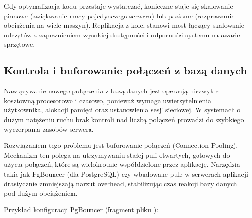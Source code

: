 \documentclass[a4paper,11pt,english,openany,oneside]{sphinxmanual}
\begin{document}
\sphinxAtStartPar
Gdy optymalizacja kodu przestaje wystarczać, konieczne staje się skalowanie \textendash{} pionowe (zwiększanie mocy pojedynczego serwera) lub poziome (rozpraszanie obciążenia na wiele maszyn). Replikacja z kolei stanowi most łączący skalowanie odczytów z zapewnieniem wysokiej dostępności i odporności systemu na awarie sprzętowe.


\subsection{Kontrola i buforowanie połączeń z bazą danych}
\label{\detokenize{rozdzial_2/rozdzial_25/index:kontrola-i-buforowanie-polaczen-z-baza-danych}}
\sphinxAtStartPar
Nawiązywanie nowego połączenia z bazą danych jest operacją niezwykle kosztowną procesorowo i czasowo, ponieważ wymaga uwierzytelnienia użytkownika, alokacji pamięci oraz ustanowienia sesji sieciowej. W systemach o dużym natężeniu ruchu brak kontroli nad liczbą połączeń prowadzi do szybkiego wyczerpania zasobów serwera.

\sphinxAtStartPar
Rozwiązaniem tego problemu jest buforowanie połączeń (Connection Pooling). Mechanizm ten polega na utrzymywaniu stałej puli otwartych, gotowych do użycia połączeń, które są wielokrotnie współdzielone przez aplikację. Narzędzia takie jak PgBouncer (dla PostgreSQL) czy wbudowane pule w serwerach aplikacji drastycznie zmniejszają narzut overhead, stabilizując czas reakcji bazy danych pod dużym obciążeniem.

\sphinxAtStartPar
Przykład konfiguracji PgBouncer (fragment pliku ):

\begin{sphinxVerbatim}[commandchars=\\\{\}]

\end{sphinxVerbatim}
\end{document}

